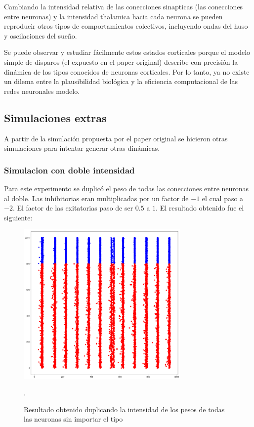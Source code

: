\documentclass[12pt]{article}
\begin{document}
Cambiando la intensidad relativa de las conecciones sinapticas (las conecciones entre neuronas) y la intensidad thalamica hacia cada neurona se pueden reproducir otros tipos de comportamientos
colectivos, incluyendo ondas del huso y oscilaciones del sueño.

Se puede observar y estudiar fácilmente estos estados corticales porque el modelo simple de disparos (el expuesto en el paper original) describe con precisión la dinámica de los tipos conocidos
de neuronas corticales. Por lo tanto, ya no existe un dilema entre la plausibilidad biológica y la eficiencia computacional de las redes neuronales modelo.

\subsection{Simulaciones extras}
A partir de la simulación propuesta por el paper original se hicieron otras simulaciones para intentar generar otras dinámicas.

\subsubsection{Simulacion con doble intensidad}
Para este experimento se duplicó el peso de todas las conecciones entre neuronas al doble. Las inhibitorias eran multiplicadas por un factor de $-1$ el cual paso a $-2$.
El factor de las exitatorias paso de ser $0.5$ a $1$. El resultado obtenido fue el siguiente:

\begin{figure}[h!]
    \centering
        \includegraphics[height=8cm]{images/resultadoDobleAmbos.png}
    \caption[fontsize=2pt]{Resultado obtenido duplicando la intensidad de los pesos de todas las neuronas sin importar el tipo}.
\end{figure}
\end{document}
